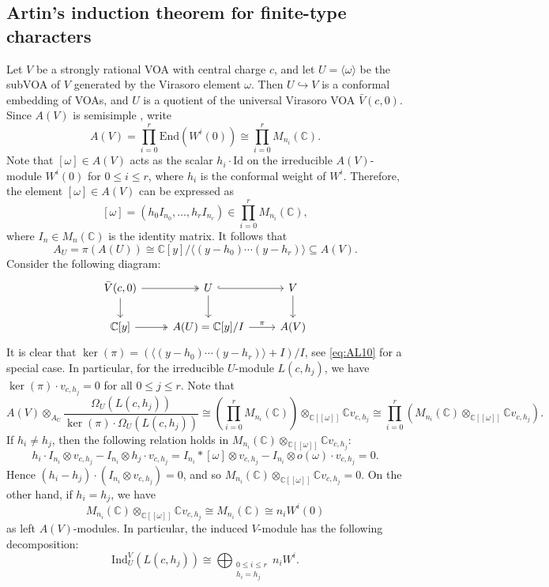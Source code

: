 \documentclass[12pt,a4paper,reqno]{amsart}
\numberwithin{equation}{section}
\numberwithin{equation}{section}
\theoremstyle{definition}
\def \C {\mathbb{C}}
\def \End {\mathrm{End}}
\def\Id{\mathrm{Id}}
\def\Ind{\mathrm{Ind}}
\def\<{\langle}
\def\>{\rangle}
\def\Ind{\mathrm{Ind}}
\begin{document}
	\subsection{Artin's induction theorem for finite-type characters}
	Let $V$ be a strongly rational VOA with central charge $c$, and let $U=\<\omega\>$ be the subVOA of $V$ generated by the Virasoro element $\omega$. Then $U \hookrightarrow V$ is a conformal embedding of VOAs, and $U$ is a quotient of the universal Virasoro VOA $\bar{V}(c,0)$. Since $A(V)$ is semisimple \cite{DLM1,Z}, write 
	\[
	A(V)=\prod_{i=0}^r \End(W^i(0)) \cong \prod_{i=0}^r M_{n_i}(\C).
	\]
	Note that $[\omega]\in A(V)$ acts as the scalar $h_i \cdot \Id$ on the irreducible $A(V)$-module $W^i(0)$ for $0\leq i\leq r$, where $h_i$ is the conformal weight of $W^i$. Therefore, the element $[\omega]\in A(V)$ can be expressed as 
	\[
	[\omega]=(h_0 I_{n_0},\dots,h_r I_{n_r})\in \prod_{i=0}^r M_{n_i}(\C),
	\]
	where $I_{n}\in M_n(\C)$ is the identity matrix. It follows that 
	\[
	A_U=\pi(A(U))\cong \C[y]/\<(y-h_0)\cdots(y-h_r)\>\subseteq A(V).
	\]
	Consider the following diagram:
	\[
	\begin{tikzcd}
		\bar{V}(c,0)\arrow[r,two heads] \arrow[d]& U\arrow[r,hook]\arrow[d]& V\arrow[d]\\
		\C[y]\arrow[r,two heads]& A(U)=\C[y]/I\arrow[r,"\pi"]& A(V)
	\end{tikzcd}
	\]
	It is clear that $\ker(\pi)=(\<(y-h_0)\cdots(y-h_r)\>+I)/I$, see \eqref{eq:AL10} for a special case. In particular, for the irreducible $U$-module $L(c,h_j)$, we have $\ker(\pi)\cdot v_{c,h_j}=0$ for all $0\leq j\leq r$. 
	Note that 
	\[
	A(V)\otimes_{A_U}\frac{\Omega_U(L(c,h_j))}{\ker(\pi)\cdot\Omega_U(L(c,h_j))}\cong 
	\left(\prod_{i=0}^r M_{n_i}(\C)\right)\otimes_{\C[[\omega]]} \C v_{c,h_j}
	\cong \prod_{i=0}^r \left(M_{n_i}(\C)\otimes_{\C[[\omega]]}\C v_{c,h_j}\right).
	\]
	If $h_i\neq h_j$, then the following relation holds in $M_{n_i}(\C)\otimes_{\C[[\omega]]}\C v_{c,h_j}$:
	\[
	h_i\cdot I_{n_i}\otimes v_{c,h_j}-I_{n_i}\otimes h_j\cdot v_{c,h_j}
	=I_{n_i}\ast [\omega]\otimes v_{c,h_j}-I_{n_i}\otimes o(\omega)\cdot v_{c,h_j}=0.
	\]
	Hence $(h_i-h_j)\cdot (I_{n_i}\otimes v_{c,h_j})=0$, and so $M_{n_i}(\C)\otimes_{\C[[\omega]]}\C v_{c,h_j}=0$. On the other hand, if $h_i=h_j$, we have
	\[
	M_{n_i}(\C)\otimes_{\C[[\omega]]}\C v_{c,h_j}\cong M_{n_i}(\C)\cong n_i W^i(0)
	\]
	as left $A(V)$-modules. In particular, the induced $V$-module has the following decomposition:
	\[
	\Ind^V_{U} (L(c,h_j))\cong \bigoplus_{\substack{0\leq i\leq r \\ h_i=h_j}} n_i W^i.
	\]
	
\end{document}
